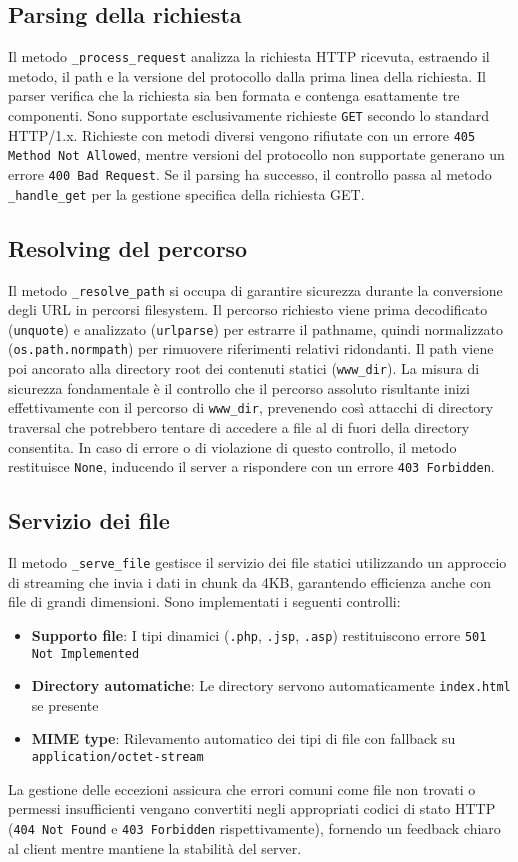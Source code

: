 \documentclass[a4paper,12pt]{report}
\begin{document}
\subsection{Parsing della richiesta}
Il metodo \texttt{\_process\_request} analizza la richiesta HTTP ricevuta, estraendo il metodo, il path e la versione del protocollo dalla prima linea della richiesta. Il parser verifica che la richiesta sia ben formata e contenga esattamente tre componenti. Sono supportate esclusivamente richieste \texttt{GET} secondo lo standard HTTP/1.x. Richieste con metodi diversi vengono rifiutate con un errore \texttt{405 Method Not Allowed}, mentre versioni del protocollo non supportate generano un errore \texttt{400 Bad Request}. Se il parsing ha successo, il controllo passa al metodo \texttt{\_handle\_get} per la gestione specifica della richiesta GET.

\subsection{Resolving del percorso}
Il metodo \texttt{\_resolve\_path} si occupa di garantire sicurezza durante la conversione degli URL in percorsi filesystem. Il percorso richiesto viene prima decodificato (\texttt{unquote}) e analizzato (\texttt{urlparse}) per estrarre il pathname, quindi normalizzato (\texttt{os.path.normpath}) per rimuovere riferimenti relativi ridondanti. Il path viene poi ancorato alla directory root dei contenuti statici (\texttt{www\_dir}). La misura di sicurezza fondamentale è il controllo che il percorso assoluto risultante inizi effettivamente con il percorso di \texttt{www\_dir}, prevenendo così attacchi di directory traversal che potrebbero tentare di accedere a file al di fuori della directory consentita. In caso di errore o di violazione di questo controllo, il metodo restituisce \texttt{None}, inducendo il server a rispondere con un errore \texttt{403 Forbidden}.

\subsection{Servizio dei file}
Il metodo \texttt{\_serve\_file} gestisce il servizio dei file statici utilizzando un approccio di streaming che invia i dati in chunk da 4KB, garantendo efficienza anche con file di grandi dimensioni. Sono implementati i seguenti controlli:
\begin{itemize}
    \item \textbf{Supporto file}: I tipi dinamici (\texttt{.php}, \texttt{.jsp}, \texttt{.asp}) restituiscono errore \texttt{501 Not Implemented}
    \item \textbf{Directory automatiche}: Le directory servono automaticamente \texttt{index.html} se presente
    \item \textbf{MIME type}: Rilevamento automatico dei tipi di file con fallback su \texttt{application/octet-stream}
\end{itemize}
La gestione delle eccezioni assicura che errori comuni come file non trovati o permessi insufficienti vengano convertiti negli appropriati codici di stato HTTP (\texttt{404 Not Found} e \texttt{403 Forbidden} rispettivamente), fornendo un feedback chiaro al client mentre mantiene la stabilità del server.
\end{document}
